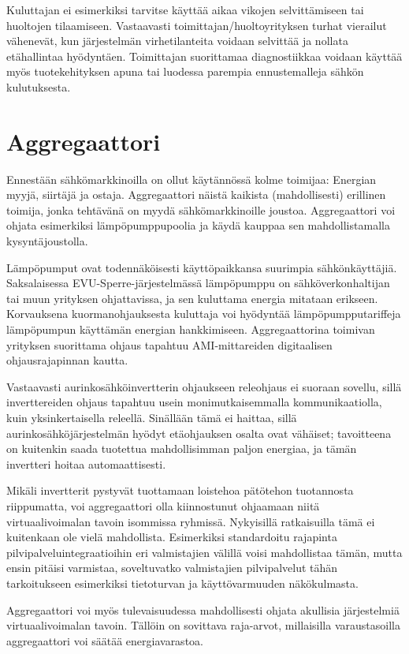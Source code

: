   Kuluttajan ei esimerkiksi tarvitse käyttää aikaa vikojen selvittämiseen tai huoltojen tilaamiseen. Vastaavasti toimittajan/huoltoyrityksen turhat vierailut vähenevät, kun järjestelmän virhetilanteita voidaan selvittää ja nollata etähallintaa hyödyntäen. Toimittajan suorittamaa diagnostiikkaa voidaan käyttää myös tuotekehityksen apuna tai luodessa parempia ennustemalleja sähkön kulutuksesta.

\section{Aggregaattori}

  Ennestään sähkömarkkinoilla on ollut käytännössä kolme toimijaa: Energian myyjä, siirtäjä ja ostaja. Aggregaattori näistä kaikista (mahdollisesti) erillinen toimija, jonka tehtävänä on myydä sähkömarkkinoille joustoa. Aggregaattori voi ohjata esimerkiksi lämpöpumppupoolia ja käydä kauppaa sen mahdollistamalla kysyntäjoustolla.

  Lämpöpumput ovat todennäköisesti käyttöpaikkansa suurimpia sähkönkäyttäjiä. Saksalaisessa EVU-Sperre-järjestelmässä lämpöpumppu on sähköverkonhaltijan tai muun yrityksen ohjattavissa, ja sen kuluttama energia mitataan erikseen. Korvauksena kuormanohjauksesta kuluttaja voi hyödyntää lämpöpumpputariffeja lämpöpumpun käyttämän energian hankkimiseen. Aggregaattorina toimivan yrityksen suorittama ohjaus tapahtuu AMI-mittareiden digitaalisen ohjausrajapinnan kautta. \parencite{enwg, VDEARN4100}

  Vastaavasti aurinkosähköinvertterin ohjaukseen releohjaus ei suoraan sovellu, sillä inverttereiden ohjaus tapahtuu usein monimutkaisemmalla kommunikaatiolla, kuin yksinkertaisella releellä. Sinällään tämä ei haittaa, sillä aurinkosähköjärjestelmän hyödyt etäohjauksen osalta ovat vähäiset; tavoitteena on kuitenkin saada tuotettua mahdollisimman paljon energiaa, ja tämän invertteri hoitaa automaattisesti.

  Mikäli invertterit pystyvät tuottamaan loistehoa pätötehon tuotannosta riippumatta, voi aggregaattori olla kiinnostunut ohjaamaan niitä virtuaalivoimalan tavoin isommissa ryhmissä. Nykyisillä ratkaisuilla tämä ei kuitenkaan ole vielä mahdollista. Esimerkiksi standardoitu rajapinta pilvipalveluintegraatioihin eri valmistajien välillä voisi mahdollistaa tämän, mutta ensin pitäisi varmistaa, soveltuvatko valmistajien pilvipalvelut tähän tarkoitukseen esimerkiksi tietoturvan ja käyttövarmuuden näkökulmasta.

  Aggregaattori voi myös tulevaisuudessa mahdollisesti ohjata akullisia järjestelmiä virtuaalivoimalan tavoin. Tällöin on sovittava raja-arvot, millaisilla varaustasoilla aggregaattori voi säätää energiavarastoa. 
  
